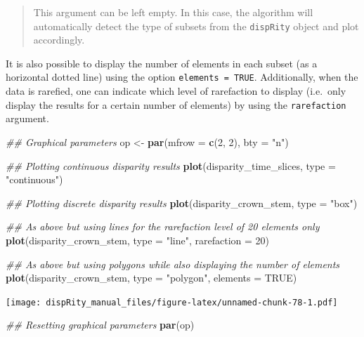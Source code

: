 \documentclass[
]{book}
\newenvironment{Shaded}{\begin{snugshade}}{\end{snugshade}}
\newcommand{\CommentTok}[1]{\textcolor[rgb]{0.56,0.35,0.01}{\textit{#1}}}
\newcommand{\DataTypeTok}[1]{\textcolor[rgb]{0.13,0.29,0.53}{#1}}
\newcommand{\DecValTok}[1]{\textcolor[rgb]{0.00,0.00,0.81}{#1}}
\newcommand{\KeywordTok}[1]{\textcolor[rgb]{0.13,0.29,0.53}{\textbf{#1}}}
\newcommand{\NormalTok}[1]{#1}
\newcommand{\OtherTok}[1]{\textcolor[rgb]{0.56,0.35,0.01}{#1}}
\newcommand{\StringTok}[1]{\textcolor[rgb]{0.31,0.60,0.02}{#1}}
\begin{document}
\begin{quote}
This argument can be left empty. In this case, the algorithm will automatically detect the type of subsets from the \texttt{dispRity} object and plot accordingly.
\end{quote}

It is also possible to display the number of elements in each subset (as a horizontal dotted line) using the option \texttt{elements\ =\ TRUE}.
Additionally, when the data is rarefied, one can indicate which level of rarefaction to display (i.e.~only display the results for a certain number of elements) by using the \texttt{rarefaction} argument.

\begin{Shaded}
\begin{Highlighting}[]
\CommentTok{\#\# Graphical parameters}
\NormalTok{op \textless{}{-}}\StringTok{ }\KeywordTok{par}\NormalTok{(}\DataTypeTok{mfrow =} \KeywordTok{c}\NormalTok{(}\DecValTok{2}\NormalTok{, }\DecValTok{2}\NormalTok{), }\DataTypeTok{bty =} \StringTok{"n"}\NormalTok{)}

\CommentTok{\#\# Plotting continuous disparity results}
\KeywordTok{plot}\NormalTok{(disparity\_time\_slices, }\DataTypeTok{type =} \StringTok{"continuous"}\NormalTok{)}

\CommentTok{\#\# Plotting discrete disparity results}
\KeywordTok{plot}\NormalTok{(disparity\_crown\_stem, }\DataTypeTok{type =} \StringTok{"box"}\NormalTok{)}

\CommentTok{\#\# As above but using lines for the rarefaction level of 20 elements only}
\KeywordTok{plot}\NormalTok{(disparity\_crown\_stem, }\DataTypeTok{type =} \StringTok{"line"}\NormalTok{, }\DataTypeTok{rarefaction =} \DecValTok{20}\NormalTok{)}

\CommentTok{\#\# As above but using polygons while also displaying the number of elements}
\KeywordTok{plot}\NormalTok{(disparity\_crown\_stem, }\DataTypeTok{type =} \StringTok{"polygon"}\NormalTok{, }\DataTypeTok{elements =} \OtherTok{TRUE}\NormalTok{)}
\end{Highlighting}
\end{Shaded}

\texttt{[image: dispRity\_manual\_files/figure-latex/unnamed-chunk-78-1.pdf]}

\begin{Shaded}
\begin{Highlighting}[]
\CommentTok{\#\# Resetting graphical parameters}
\KeywordTok{par}\NormalTok{(op)}
\end{Highlighting}
\end{Shaded}
\end{document}
